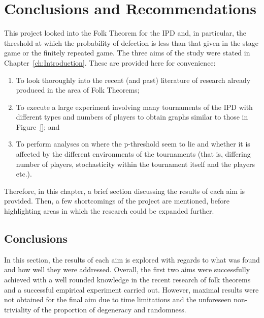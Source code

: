 \chapter{Conclusions and Recommendations}\label{ch:Conclusions_and_Recommendations}


This project looked into the Folk Theorem for the IPD and, in particular, the
threshold at which the probability of defection is less than that given in the
stage game or the finitely repeated game. The three aims of the study were
stated in Chapter~\ref{ch:Introduction}. These are provided here for
convenience:

\begin{enumerate}
    \item To look thoroughly into the recent (and past) literature of research
    already produced in the area of Folk Theorems;
    \item To execute a large experiment involving many tournaments of the IPD
    with different types and numbers of players to obtain graphs similar to
    those in Figure~\ref{}; and
    \item To perform analyses on where the p-threshold seem to lie and whether
    it is affected by the different environments of the tournaments (that is,
    differing number of players, stochasticity within the tournament itself and
    the players etc.).
\end{enumerate}

Therefore, in this chapter, a brief section discussing the results of each aim
is provided. Then, a few shortcomings of the project are mentioned, before
highlighting areas in which the research could be expanded further.

\section{Conclusions}\label{sec:Conclusions}
In this section, the results of each aim is explored with regards to what was
found and how well they were addressed. Overall, the first two aims were
successfully achieved with a well rounded knowledge in the recent research of
folk theorems and a successful empirical experiment carried out. However,
maximal results were not obtained for the final aim due to time limitations and
the unforeseen non-triviality of the proportion of degeneracy and randomness.


